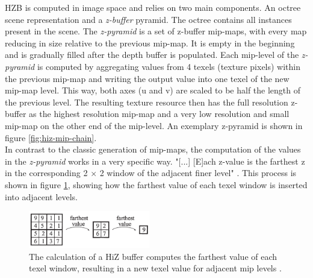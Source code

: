\noindent
\ac{HZB} is computed in image space and relies on two main components. An octree scene representation and a 
\emph{z-buffer} pyramid. The octree contains all instances present in the scene. The \emph{z-pyramid} is a set of 
z-buffer mip-maps, with every map reducing in size relative to the previous mip-map. It is empty in the beginning 
and is gradually filled after the depth buffer is populated. Each mip-level of the \emph{z-pyramid} is computed by 
aggregating values from 4 texels (texture pixels) within the previous mip-map and writing the output value into one 
texel of the new mip-map level. This way, both axes (u and v) are scaled to be half the length of the previous level. 
The resulting texture resource then has the full resolution z-buffer as the highest resolution mip-map and a very 
low resolution and small mip-map on the other end of the mip-level. An exemplary z-pyramid is shown in figure 
\ref{fig:hiz-mip-chain}.\\

\noindent
In contrast to the classic generation of mip-maps, the computation of the values in the \emph{z-pyramid} works in a 
very specific way. "[...] [E]ach z-value is the farthest z in the corresponding 2 \begin{math}\times\end{math} 2 window 
of the adjacent finer level" \cite{AkenineMoeller2018}. This process is shown in figure \ref{fig:hiz-value-computation}, 
showing how the farthest value of each texel window is inserted into adjacent levels.\\

\begin{figure}[!]
    \centering
    \includegraphics[width=200px]{images/graphics/hiz-buf-values.jpg}
    \caption{The calculation of a \ac{HiZ} buffer computes the farthest value of each texel window, 
    resulting in a new texel value for adjacent mip levels \cite{AkenineMoeller2018}.}
    \label{fig:hiz-value-computation}
\end{figure}

